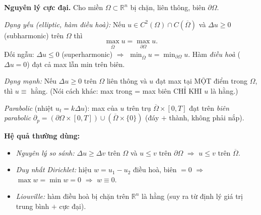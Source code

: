 \textbf{Nguyên lý cực đại.} Cho miền $\Omega\subset\mathbb{R}^n$ bị chặn, liên thông, biên $\partial\Omega$.

\emph{Dạng yếu (elliptic, hàm điều hoà):} Nếu $u\in C^2(\Omega)\cap C(\overline{\Omega})$ và $\Delta u\ge 0$ (subharmonic) trên $\Omega$ thì
\[
  \max_{\overline{\Omega}} u = \max_{\partial\Omega} u.
\]
Đối ngẫu: $\Delta u\le 0$ (superharmonic) $\Rightarrow$ $\min_{\overline{\Omega}}u=\min_{\partial\Omega}u$. Hàm \emph{điều hoà} ($\Delta u=0$) đạt cả max lẫn min trên biên.

\emph{Dạng mạnh:} Nếu $\Delta u\ge 0$ trên $\Omega$ liên thông và $u$ đạt max tại MỘT điểm trong $\Omega$, thì $u\equiv$ hằng. (Nói cách khác: max trong = max biên CHỈ KHI $u$ là hằng.)

\emph{Parabolic} (nhiệt $u_t=k\Delta u$): max của $u$ trên trụ $\overline{\Omega}\times[0,T]$ đạt trên \emph{biên parabolic} $\partial_p=(\partial\Omega\times[0,T])\cup(\overline{\Omega}\times\{0\})$ (đáy $+$ thành, không phải nắp).

\textbf{Hệ quả thường dùng:}
\begin{itemize}
  \item \emph{Nguyên lý so sánh:} $\Delta u\ge\Delta v$ trên $\Omega$ và $u\le v$ trên $\partial\Omega$ $\Rightarrow$ $u\le v$ trên $\overline{\Omega}$.
  \item \emph{Duy nhất Dirichlet:} hiệu $w=u_1-u_2$ điều hoà, biên $=0$ $\Rightarrow$ $\max w=\min w=0$ $\Rightarrow$ $w\equiv 0$.
  \item \emph{Liouville:} hàm điều hoà bị chặn trên $\mathbb{R}^n$ là hằng (suy ra từ định lý giá trị trung bình $+$ cực đại).
\end{itemize}
